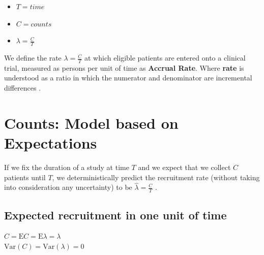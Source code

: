 \begin{itemize}
\item $T=time$
\item $C=counts$
\item $\lambda=\frac{C}{T}$
\end{itemize}

We define the rate $\lambda=\frac{C}{T}$ at which eligible patients are entered onto a clinical trial, measured as persons per unit of time as \textbf{Accrual Rate}. Where \textbf{rate} is understood as a ratio in which the numerator and denominator are incremental differences \citep{piantadosi2024clinical}. 

\begin{table}[h!]
\centering
{}
\caption{Moments and aleatory and epistemic uncertainty in accrual covered by different models for counts.}
\label{tab:count_modeling}
\end{table}

\section{Counts: Model based on Expectations}
\label{sec:expect}

If we fix the duration of a study at time $T$ and we expect that we collect $C$ patients until $T$, we deterministically predict the recruitment rate (without taking into consideration any uncertainty) to be $\hat{\lambda}=\frac{C}{T}$ . 


\subsection{Expected recruitment in one unit of time}
$C = \textrm{E}C = \textrm{E}\lambda = \lambda$\\
$\textrm{Var}(C) = \textrm{Var}(\lambda) = 0$


